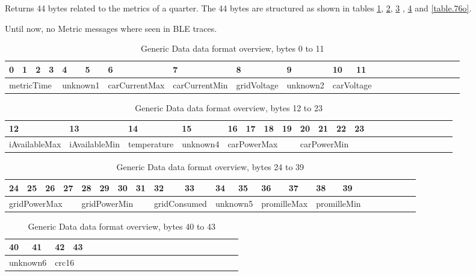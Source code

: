 \documentclass[a4paper]{article}
\begin{document}
Returns 44 bytes related to the metrics of a quarter. 
The 44 bytes are structured as shown in tables \ref{table.77a},  \ref{table.77b},  \ref{table.77c} ,  \ref{table.77d}  and \ref{table.76o}.

Until now, no Metric messages where seen in BLE traces.

\begin{longtable}{|l|l|l|l|l|l|l|l|l|l|l|l|l|l|l|l|l|l|l|l|l|l|}
	\caption{Generic Data data format overview, bytes 0 to 11}
	\label{table.77a}\\  %
	\hline
	0 & 1 & 2 & 3 & 4 & 5 & 6 & 7 & 8 & 9 & 10  & 11\\
	\hline
	\multicolumn{4}{|l|}{metricTime} & 
        \multicolumn{2}{l|}{unknown1} & carCurrentMax & carCurrentMin & gridVoltage & unknown2 &
        \multicolumn{2}{l|}{carVoltage}  \\
	\hline
\end{longtable}

\begin{longtable}{|l|l|l|l|l|l|l|l|l|l|l|l|l|l|l|l|l|l|l|l|l|l|}
	\caption{Generic Data data format overview, bytes 12 to 23}
	\label{table.77b}\\  %
	\hline
       12 & 13 & 14 & 15 &16 & 17 & 18 & 19 & 20 & 21 & 22 & 23   \\
	\hline
       iAvailableMax & iAvailableMin & temperature & unknown4 &
	\multicolumn{4}{|l|}{carPowerMax} & 
	\multicolumn{4}{|l|}{carPowerMin} \\
	\hline
\end{longtable}

\begin{longtable}{|l|l|l|l|l|l|l|l|l|l|l|l|l|l|l|l|l|l|l|l|l|l|}
	\caption{Generic Data data format overview, bytes 24 to 39}
	\label{table.77c}\\  %
	\hline
	24 & 25 & 26 & 27 & 28 & 29 & 30 & 31 &32 & 33 & 34 & 35 & 36 & 37 & 38 & 39 \\
	\hline
	\multicolumn{4}{|l|}{gridPowerMax} & 
	\multicolumn{4}{|l|}{gridPowerMin} & 
	\multicolumn{2}{|l|}{gridConsumed} & 
	\multicolumn{2}{|l|}{unknown5} & 
	\multicolumn{2}{|l|}{promilleMax} & 
	\multicolumn{2}{|l|}{promilleMin} \\
	\hline
\end{longtable}

\begin{longtable}{|l|l|l|l|l|l|l|l|l|l|l|l|l|l|l|l|l|l|l|l|l|l|}
	\caption{Generic Data data format overview, bytes 40 to 43}
	\label{table.77d}\\  %
	\hline
        40 & 41  & 42 & 43\\
	\hline
	\multicolumn{2}{|l|}{unknown6} & 
        \multicolumn{2}{l|}{crc16}\\
	\hline
\end{longtable}
\end{document}
